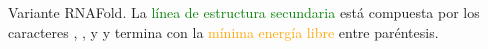 \label{rnafoldfmt} \captionStyle Variante RNAFold. La
  \textcolor{green}{línea de estructura secundaria} está compuesta por
  los caracteres \mono{(}, \mono{)}, y  y termina con la
  \textcolor{orange}{mínima energía libre} entre paréntesis.